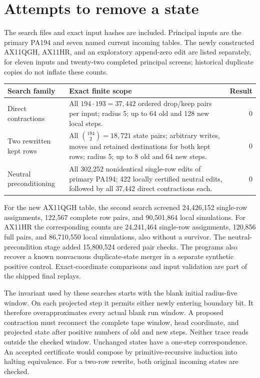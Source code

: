 \documentclass[11pt,letterpaper]{article}
\begin{document}
\section{Attempts to remove a state}
\label{sec:search}

The search files and exact input hashes are included. Principal inputs are
the primary PA194 and seven named current incoming tables. The newly
constructed AX11QGH, AX11HR, and an exploratory append-zero edit are listed
separately, for eleven inputs and twenty-two completed principal screens;
historical duplicate copies do not inflate these counts.

\begin{center}
\begin{tabularx}{\linewidth}{@{}lXr@{}}
\toprule Search family & Exact finite scope & Result\\\midrule
Direct contractions & All $194\cdot193=37,442$ ordered drop/keep
pairs per input; radius 5; up to 64 old and 128 new local steps. &0\\
Two rewritten kept rows & All $\binom{194}{2}=18,721$ state pairs;
arbitrary writes, moves and retained destinations for both kept rows;
radius 5; up to 8 old and 64 new steps. &0\\
Neutral preconditioning & All 302,252 nonidentical single-row edits of
primary PA194; 422 locally certified neutral edits, followed by all
37,442 direct contractions each. &0\\
\bottomrule
\end{tabularx}
\end{center}

For the new AX11QGH table, the second search screened 24,426,152 single-row
assignments, 122,567 complete row pairs, and 90,501,864 local simulations.
For AX11HR the corresponding counts are 24,241,464 single-row assignments,
120,856 full pairs, and 86,710,550 local simulations, also without a survivor.
The neutral-precondition stage added 15,800,524 ordered pair checks.
The programs also recover a known nonvacuous duplicate-state merger in a
separate synthetic positive control. Exact-coordinate comparisons and
input validation are part of the shipped final replays.

The invariant used by these searches starts with the blank initial
radius-five window. On each projected step it permits either newly
entering boundary bit. It therefore overapproximates every actual blank
run window. A proposed contraction must reconnect the complete tape
window, head coordinate, and projected state after positive numbers of
old and new steps. Neither trace reads outside the checked window.
Unchanged states have a one-step correspondence. An accepted certificate
would compose by primitive-recursive induction into halting equivalence.
For a two-row rewrite, both original incoming states are checked.
\end{document}
